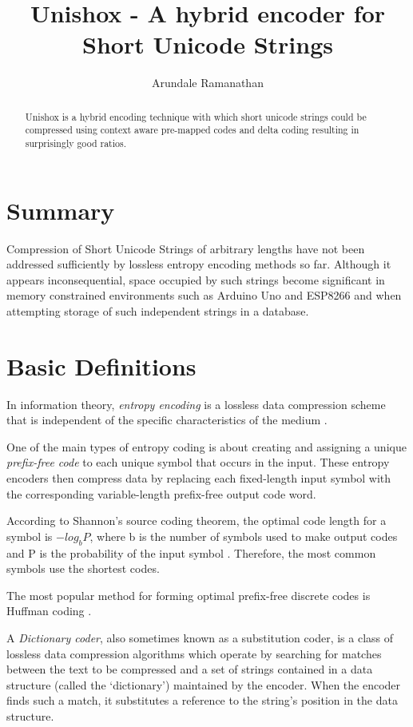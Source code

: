\documentclass[]{article}
\title{Unishox - A hybrid encoder for Short Unicode Strings}
\author{Arundale Ramanathan}
\begin{document}
\maketitle

\begin{abstract}
Unishox is a hybrid encoding technique with which short unicode strings could be compressed using context aware pre-mapped codes and delta coding resulting in surprisingly good ratios.

\end{abstract}

\section{Summary}

Compression of Short Unicode Strings of arbitrary lengths have not been addressed sufficiently by lossless entropy encoding methods so far.  Although it appears inconsequential, space occupied by such strings become significant in memory constrained environments such as Arduino Uno and ESP8266 and when attempting storage of such independent strings in a database.

\section{Basic Definitions}

In information theory, \emph{entropy encoding} is a lossless data compression scheme that is independent of the specific characteristics of the medium \cite{1}.

One of the main types of entropy coding is about creating and assigning a unique \emph{prefix-free code} to each unique symbol that occurs in the input. These entropy encoders then compress data by replacing each fixed-length input symbol with the corresponding variable-length prefix-free output code word.

According to Shannon's source coding theorem, the optimal code length for a symbol is $-log_bP$, where b is the number of symbols used to make output codes and P is the probability of the input symbol \cite{2}. Therefore, the most common symbols use the shortest codes.

The most popular method for forming optimal prefix-free discrete codes is Huffman coding \cite{3}.

A \emph{Dictionary coder}, also sometimes known as a substitution coder, is a class of lossless data compression algorithms which operate by searching for matches between the text to be compressed and a set of strings contained in a data structure (called the \lq{dictionary}\rq) maintained by the encoder. When the encoder finds such a match, it substitutes a reference to the string's position in the data structure.
\end{document}
